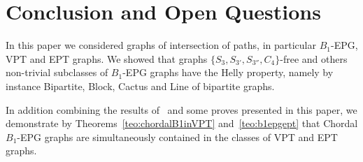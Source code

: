 \documentclass[9pt]{entcs}
\begin{document}


\section{Conclusion and Open Questions}

In this paper we considered graphs of intersection of paths, in particular $B_1$-EPG, VPT and EPT graphs. We showed that graphs $\{S_3, S_{3'},S_{3''},C_4\}$-free and others non-trivial subclasses of  $B_1$-EPG graphs have the Helly property, namely by instance Bipartite, Block, Cactus and Line of bipartite graphs. 
  
  In addition combining the results of~\cite{alcon2014recognizing,Asinowski2009, golumbic2009} and some proves  presented in this paper, we demonstrate by  Theorems~\ref{teo:chordalB1inVPT} and~\ref{teo:b1epgept} that Chordal $B_1$-EPG graphs are simultaneously contained in the classes of VPT and EPT graphs.  
 
 
\end{document}

